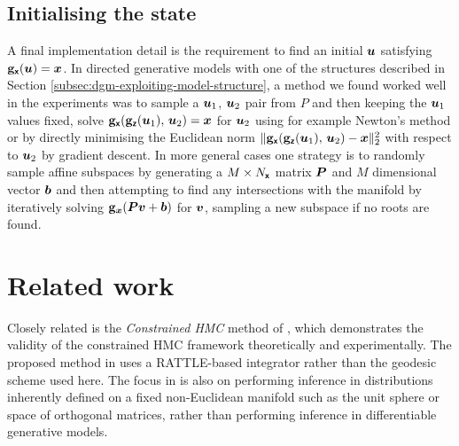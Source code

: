 \subsection{Initialising the state}

A final implementation detail is the requirement to find an initial $\boldsymbol{u}$ satisfying ${\mathbf{g}}_{\boldsymbol{\mathsf{x}}}(\boldsymbol{u}) = \boldsymbol{x}$. In directed generative models with one of the structures described in Section \ref{subsec:dgm-exploiting-model-structure}, a method we found worked well in the experiments was to sample a $\boldsymbol{u}_1$, $\boldsymbol{u}_2$ pair from $P$ and then keeping the $\boldsymbol{u}_1$ values fixed, solve $\genfunc_{\rvct{x}}\lpa\genfunc_{\rvct{z}}(\vct{u}_1),\,\vct{u}_2\rpa= \vct{x}$ for $\boldsymbol{u}_2$ using for example Newton's method or by directly minimising the Euclidean norm $\Vert\genfunc_{\rvct{x}}\lpa\genfunc_{\rvct{z}}(\vct{u}_1),\,\vct{u}_2\rpa - \vct{x}\Vert_2^2$ with respect to $\boldsymbol{u}_2$ by gradient descent. In more general cases one strategy is to randomly sample affine subspaces by generating a $M \times N_{\boldsymbol{\mathsf{x}}}$ matrix $\boldsymbol{P}$ and $M$ dimensional vector $\boldsymbol{b}$ and then attempting to find any intersections with the manifold by iteratively solving $\genfunc_{\vct{x}}\lpa\mtx{P}\vct{v} + \vct{b}\rpa$ for $\boldsymbol{v}$, sampling a new subspace if no roots are found.


\section{Related work}\label{sec:related-work}

Closely related is the \emph{Constrained \ac{HMC}} method of \citep{brubaker2012family}, which demonstrates the validity of the constrained \ac{HMC} framework theoretically and experimentally. The proposed method in \citep{brubaker2012family} uses a RATTLE-based integrator rather than the geodesic scheme used here. The focus in \citep{brubaker2012family} is also on performing inference in distributions inherently defined on a fixed non-Euclidean manifold such as the unit sphere or space of orthogonal matrices, rather than performing inference in differentiable generative models. %

